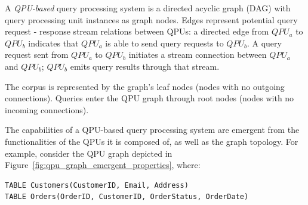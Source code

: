 A \textit{QPU-based} query processing system is a directed acyclic graph (DAG) with query processing unit instances as
graph nodes.
Edges represent potential query request - response stream relations between QPUs:
a directed edge from $QPU_a$ to $QPU_b$ indicates that $QPU_a$ is able to send query requests to $QPU_b$.
A query request sent from $QPU_a$ to $QPU_b$ initiates a stream connection between $QPU_a$ and $QPU_b$;
$QPU_b$ emits query results through that stream.

The corpus is represented by the graph's leaf nodes (nodes with no outgoing connections).
Queries enter the QPU graph through root nodes (nodes with no incoming connections).

The capabilities of a QPU-based query processing system are emergent from the functionalities of the QPUs it is composed of,
as well as the graph topology.
For example, consider the QPU graph depicted in Figure~\ref{fig:qpu_graph_emergent_properties}, where:

\begin{lstlisting}[caption={Customer and Orders tables attributes}]
TABLE Customers(CustomerID, Email, Address)
TABLE Orders(OrderID, CustomerID, OrderStatus, OrderDate)
\end{lstlisting}

